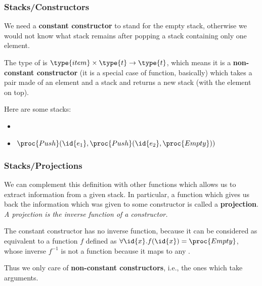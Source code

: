 %
\begin{frame}
\frametitle{Stacks/Constructors}

We need a \textbf{constant constructor} to stand for the empty stack,
otherwise we would not know what stack remains after popping a stack
containing only one element.

\bigskip

The type of  is \(\type{item} \times \type{t}
\rightarrow \type{t}\), which means it is a \textbf{non-constant
constructor} (it is a special case of function, basically) which takes
a pair made of an element and a stack and returns a new stack (with
the element on top).

\bigskip

Here are some stacks:
\begin{itemize}

  \item {}

  \item \(\proc{Push} (\id{e_1}, \proc{Push} (\id{e_2}, \proc{Empty}))\)

\end{itemize}

\end{frame}

%
\begin{frame}
\frametitle{Stacks/Projections}

We can complement this definition with other functions which allows us
to extract information from a given stack. In particular, a function
which gives us back the information which was given to some
constructor is called a \textbf{projection}. \emph{A projection is the
inverse function of a constructor.}

\bigskip

The constant constructor  has no inverse function, because
it can be considered as equivalent to a function \(f\) defined as
\(\forall \id{x}.f (\id{x}) = \proc{Empty}\), whose inverse \(f^{-1}\)
is not a function because it maps  to any .

\bigskip

Thus we only care of \textbf{non-constant constructors}, i.e., the ones
which take arguments.

\end{frame}

